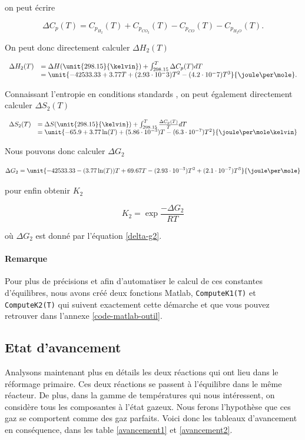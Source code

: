 on peut écrire

$$\Delta C_p(T) = C_{p_{H_2}}(T) + C_{p_{CO_2}}(T) - C_{p_{CO}}(T) - C_{p_{H_2O}}(T).$$

On peut donc directement calculer $\Delta H_2(T)$ 

$$
	\begin{array}{rl}
		 \Delta H_2(T)	&=  \Delta H(\unit{298.15}{\kelvin}) + \int_{298.15}^{T} \Delta C_p(T) dT \\
										&=  \unit{-42533.33+3.77T+(2.93\cdot 10^-3)T^2-(4.2\cdot 10^-7)T^3}{\joule\per\mole}.
	\end{array}
$$	

Connaissant l'entropie en conditions standards \cite{atkins}, on peut
également directement calculer $\Delta S_2(T)$

$$
	\begin{array}{rl}
		 	\Delta S_2(T)	&= \Delta S(\unit{298.15}{\kelvin}) 
											 + \int_{298.15}^{T} \frac{\Delta C_p(T)}{T}dT \\
										&= \unit{-65.9 + 3.77 \ln(T) +(5.86\cdot 10^{-3})T -(6.3 \cdot 10^{-7})T^2}{\joule\per\mole\kelvin}
	\end{array}
$$	

Nous pouvons donc calculer $\Delta G_2$
 
 \begin{equation}
	\Delta G_2= \unit{-42533.33 - (3.77 \ln(T))T +69.67 T -(2.93 \cdot 10^{-3})T^2 + (2.1\cdot 10^{-7})T^3}{\joule\per\mole} 
	\label{delta-g2}
 \end{equation}
 
pour enfin obtenir $K_2$

	$$K_2 = \exp{\frac{-\Delta G_2}{RT}}$$

où $\Delta G_2$ est donné par l'équation \ref{delta-g2}.

\paragraph{Remarque} Pour plus de précisions et afin d'automatiser le calcul
de ces constantes d'équilibres, nous avons créé deux fonctions Matlab, \lstinline{ComputeK1(T)}
et \lstinline{ComputeK2(T)} qui suivent exactement cette démarche et que vous
pouvez retrouver dans l'annexe \ref{code-matlab-outil}.

\subsection{Etat d'avancement}
Analysons maintenant plus en détails les deux réactions qui ont lieu dans le réformage primaire.
Ces deux réactions se passent à l'équilibre dans le même réacteur. 
De plus, dans la gamme de températures qui nous intéressent, on considère tous les composantes à l'état gazeux.
Nous ferons l'hypothèse que ces gaz se comportent comme des gaz parfaits.
Voici donc les tableaux d'avancement en conséquence, dans les table \ref{avancement1} et \ref{avancement2}.
  
